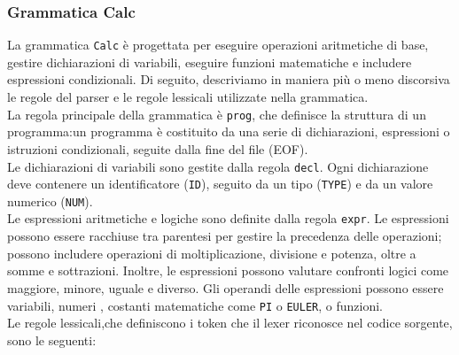 \documentclass{article}
\begin{document}
\subsubsection{Grammatica Calc}

La grammatica \texttt{Calc} è progettata per eseguire operazioni aritmetiche di base, gestire dichiarazioni di variabili, eseguire funzioni matematiche e includere espressioni condizionali. Di seguito, descriviamo in maniera più o meno discorsiva le regole del parser e le regole lessicali utilizzate nella grammatica.
\\\noindent
La regola principale della grammatica è \texttt{prog}, che definisce la struttura di un programma:un programma è costituito da una serie di dichiarazioni, espressioni o istruzioni condizionali, seguite dalla fine del file (EOF). \\
\noindent
Le dichiarazioni di variabili sono gestite dalla regola \texttt{decl}. Ogni dichiarazione deve contenere un identificatore (\texttt{ID}), seguito da un tipo (\texttt{TYPE}) e da un valore numerico (\texttt{NUM}).
\\\noindent
Le espressioni aritmetiche e logiche sono definite dalla regola \texttt{expr}. Le espressioni possono essere racchiuse tra parentesi per gestire la precedenza delle operazioni; possono includere operazioni di moltiplicazione, divisione e potenza, oltre a somme e sottrazioni. Inoltre, le espressioni possono valutare confronti logici come maggiore, minore, uguale e diverso. Gli operandi delle espressioni possono essere variabili, numeri , costanti matematiche come \texttt{PI} o \texttt{EULER}, o funzioni.
\\\noindent
Le regole lessicali,che definiscono i token che il lexer riconosce nel codice sorgente, sono le seguenti:
\end{document}
